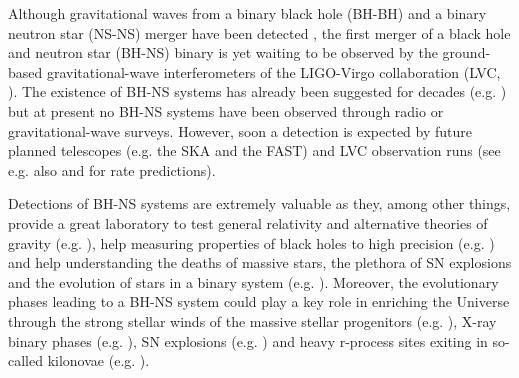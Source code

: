 \documentclass[a4paper,fleqn,usenatbib,useAMS,usedcolumn]{mnras}
\begin{document}
%
Although gravitational waves from a binary black hole (BH-BH) and  a binary neutron star  (NS-NS) merger have been detected  \citep{abbott2016binary, abbott2016observation,abbott2016gw151226, abbott2016astrophysical,   Abbott:2017vtc, abbott2017gw170814,  abbott2017gw170817,  abbott2017multi, abbott2017gw170608}, the first  merger of a black hole and neutron star (BH-NS) binary is yet waiting to be observed by the ground-based gravitational-wave interferometers of the LIGO-Virgo collaboration (LVC,    \citealt{aasi2015advanced,acernese2014advanced}).
The existence of BH-NS systems has already been suggested for decades (e.g. \citealt{Narayan:1991fn, tutukov1993merger, 1994ApJ...423L.121L, Bethe:1998th, Belczynski:2001uc, Belczynski:2001qx,Belczynski:2006br, Sipior:2002gs,doi:10.1111/j.1365-2966.2004.08373.x,  Lipunov:2005sv, Pfahl:2005cn,  doi:10.1111/j.1365-2966.2011.19019.x,     2014A&A...564A.134M}) but at present no BH-NS systems have been observed through radio or gravitational-wave surveys. However, soon a detection is expected by  future  planned telescopes (e.g. the SKA and the FAST) and  LVC observation runs (see e.g. also \citealt{Liu:2014uka} and \citealt{abbott2018prospects} for rate predictions).

Detections of  BH-NS systems are extremely valuable as they, among other things, provide a great laboratory to test general relativity and alternative theories of gravity (e.g. \citealt{Wex:1998wt,KRAMER2004993}), help measuring properties of black holes to high precision  (e.g.  \citealt{1975ApJ...198L..27B,1975SvAL....1....2B}) and help understanding the deaths of massive stars, the plethora of SN explosions and the evolution of stars in a binary system (e.g. \citealt{2004Sci...304..547S, OShaughnessy:2006uzj,2010ApJ...725..940Y}).  Moreover, the evolutionary phases leading to a BH-NS system could play a key role in enriching  the Universe   through the strong stellar winds of the massive stellar progenitors (e.g. \citealt{woosley2007nucleosynthesis}), X-ray binary phases (e.g. \citealt{Fragos:2013bfa, doi:10.1111/j.1365-2966.2012.20985.x}),  SN explosions (e.g. \citealt{1974MNRAS.169..229L, 1979ARA&A..17..213M}) and heavy r-process sites exiting in so-called kilonovae (e.g. \citealt{1974ApJ...192L.145L, 1976ApJ...210..549L, Li:1998bw, Rosswog:1998gc,doi:10.1093/mnras/stv009, 2010MNRAS.406.2650M, 2015ApJ...807..115S, doi:10.1093/mnras/stu2404}). 
%
\end{document}
